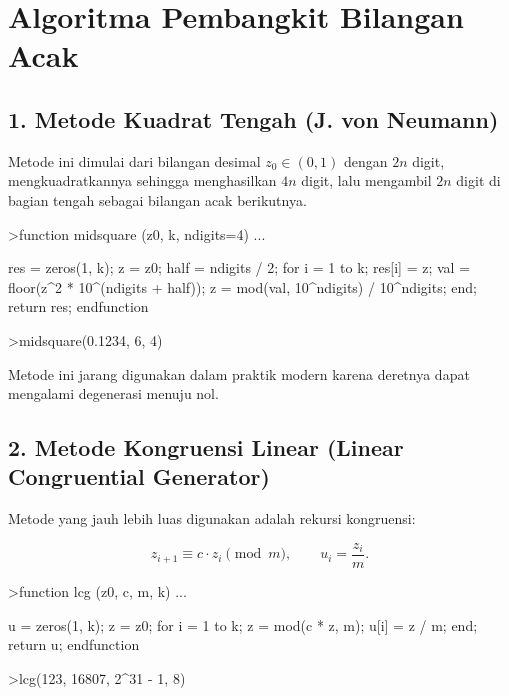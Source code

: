 \documentclass[a4paper,11pt,oneside,enabledeprecatedfontcommands]{scrbook}
\newenvironment{eulernotebook}{}{}
\newcommand{\eulerheading}[1]{\chapter{#1}}
\newcommand{\eulersubheading}[1]{\section{#1}}
\newenvironment{eulercomment}{\par\medskip\noindent}{\par\medskip}
\newenvironment{eulerformula}{}{}
\begin{document}
\begin{eulernotebook}
		\eulerheading{Algoritma Pembangkit Bilangan Acak}
		\eulersubheading{1. Metode Kuadrat Tengah (J. von Neumann)}
		\begin{eulercomment}
			Metode ini dimulai dari bilangan desimal $z_0 \in (0, 1)$
			dengan $2n$ digit, mengkuadratkannya sehingga menghasilkan $4n$ digit, lalu mengambil $2n$ digit di bagian
			tengah sebagai bilangan acak berikutnya.
		\end{eulercomment}
		\begin{eulerprompt}
			>function midsquare (z0, k, ndigits=4) ...
		\end{eulerprompt}
		\begin{eulerudf}
			res = zeros(1, k);
			z = z0;
			half = ndigits / 2;
			for i = 1 to k;
			  res[i] = z;
			  val = floor(z^2 * 10^(ndigits + half));
			  z = mod(val, 10^ndigits) / 10^ndigits;
			end;
			return res;
			endfunction
		\end{eulerudf}
		\begin{eulerprompt}
			>midsquare(0.1234, 6, 4)
		\end{eulerprompt}
		\begin{euleroutput}
			[0.1234,  0.5227,  0.3215,  0.3362,  0.303,  0.1809]
		\end{euleroutput}
		\begin{eulercomment}
			Metode ini jarang digunakan dalam praktik modern karena deretnya dapat mengalami degenerasi menuju
			nol.
		\end{eulercomment}
		
		\eulersubheading{2. Metode Kongruensi Linear (Linear Congruential Generator)}
		\begin{eulercomment}
			Metode yang jauh lebih luas digunakan adalah rekursi kongruensi:
		\end{eulercomment}
		\begin{eulerformula}
			\[
			z_{i+1} \equiv c \cdot z_i \pmod{m}, \qquad u_i = \frac{z_i}{m}.
			\]
		\end{eulerformula}
		\begin{eulerprompt}
			>function lcg (z0, c, m, k) ...
		\end{eulerprompt}
		\begin{eulerudf}
			u = zeros(1, k);
			z = z0;
			for i = 1 to k;
			  z = mod(c * z, m);
			  u[i] = z / m;
			end;
			return u;
			endfunction
		\end{eulerudf}
		\begin{eulerprompt}
			>lcg(123, 16807, 2^31 - 1, 8)
		\end{eulerprompt}
		\begin{euleroutput}
			[0.00096264,  0.17915,  0.93945,  0.41397,  0.53037,  0.93198,  0.78649,  0.50036]
		\end{euleroutput}
		

\end{eulernotebook}
\end{document}
